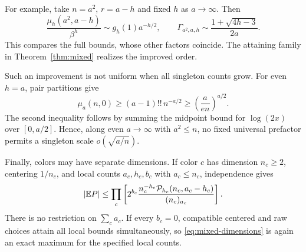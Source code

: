 For example, take $n=a^2$, $r=a-h$ and fixed $h$ as $a\to\infty$. Then
\[
\frac{\mu_h(a^2,a-h)}{\beta^h}
\sim g_h(1)a^{-h/2},
\qquad
\Gamma_{a^2,a,h}\sim\frac{1+\sqrt{4h-3}}{2a}.
\]
This compares the full bounds, whose other factors coincide. The attaining family in Theorem~\ref{thm:mixed} realizes the improved order.

Such an improvement is not uniform when all singleton counts grow. For even $h=a$, pair partitions give
\[
\mu_a(n,0)\ge(a-1)!!\,n^{-a/2}
\ge\left(\frac{a}{en}\right)^{a/2}.
\]
The second inequality follows by summing the midpoint bound for $\log(2x)$ over $[0,a/2]$. Hence, along even $a\to\infty$ with $a^2\le n$, no fixed universal prefactor permits a singleton scale $o(\sqrt{a/n})$.

Finally, colors may have separate dimensions. If color $c$ has dimension $n_c\ge2$, centering $1/n_c$, and local counts $a_c,h_c,b_c$ with $a_c\le n_c$, independence gives
\begin{equation}\label{eq:mixed-dimensions}
|\mathbb E P|\le\prod_c
\left[
2^{b_c}\frac{n_c^{-h_c}\mathcal P_{h_c}(n_c,a_c-h_c)}
{(n_c)_{a_c}}
\right].
\end{equation}
There is no restriction on $\sum_c a_c$. If every $b_c=0$, compatible centered and raw choices attain all local bounds simultaneously, so \eqref{eq:mixed-dimensions} is again an exact maximum for the specified local counts.

